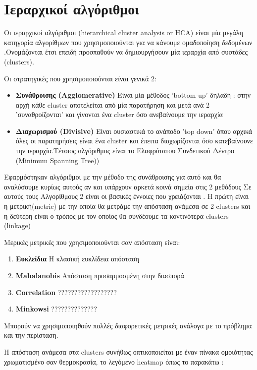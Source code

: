 \chapter{Ιεραρχικοί αλγόριθμοι}
Οι ιεραρχικοί αλγόριθμοι (hierarchical cluster analysis or HCA) είναι μία μεγάλη κατηγορία αλγορίθμων που χρησιμοποιούνται για να κάνουμε ομαδοποίηση δεδομένων .Ονομάζονται έτσι επειδή προσπαθούν να δημιουργήσουν μία ιεραρχία από συστάδες (clusters).

Οι στρατηγικές που χρησιμοποιούνται είναι γενικά 2:
\begin{itemize}
\item{ \textbf{Συνάθροισης (Agglomerative)} Είναι μία μέθοδος 'bottom-up' δηλαδή : στην αρχή κάθε cluster αποτελείται από μία παρατήρηση και μετά ανά 2 'συναθροίζονται' και γίνονται ένα cluster όσο ανεβαίνουμε την ιεραρχία  }
\item{}\textbf{Διαχωρισμού (Divisive)} Είναι ουσιαστικά το ανάποδο 'top down' όπου αρχικά όλες οι παρατηρήσεις είναι ένα cluster και έπειτα διαχωρίζονται όσο κατεβαίνουνε την ιεραρχία.Τέτοιος αλγόριθμος είναι το Ελαφρύτατου Συνδετικού Δέντρο (Minimum Spanning Tree))
\end{itemize}

Εφαρμόστηκαν αλγόριθμοι με την μέθοδο της συνάθροισης για αυτό και θα αναλύσουμε κυρίως   αυτούς αν και υπάρχουν αρκετά κοινά σημεία στις 2 μεθόδους
Σε αυτούς τους Αλγορίθμους 2 είναι οι βασικές έννοιες που χρειάζονται .
Η πρώτη είναι η μετρική(metric) με την οποία θα μετράμε την απόσταση ανάμεσα σε 2 clusters και η δεύτερη είναι ο τρόπος με τον οποίος θα συνδέουμε τα κοντινότερα clusters (linkage)

Μερικές μετρικές που χρησιμοποιούνται σαν απόσταση είναι:
\begin{enumerate}
\item \textbf{Ευκλείδια }H κλασική ευκλίδεια απόσταση
\item \textbf{Mahalanobis }Απόσταση προσαρμοσμένη στην διασπορά
\item \textbf{Correlation }??????????????????
\item \textbf{Minkowsi }  ??????????????
\end{enumerate}
Μπορούν να χρησιμοποιηθούν πολλές διαφορετικές μετρικές ανάλογα με το πρόβλημα και την περίσταση.

\begin{minipage}{\linewidth}
H απόσταση ανάμεσα στα   clusters  συνήθως οπτικοποιείται με έναν πίνακα ομοιότητας χρωματισμένο σαν θερμοκρασία, το λεγόμενο heatmap  όπως το παρακάτω :
    \label{fig:heat1}
\end{minipage}

